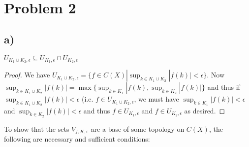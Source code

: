 \section*{Problem 2}
\subsection*{a)}
\begin{lemma}
$U_{K_1 \cup K_2,\epsilon} \subseteq U_{K_1,\epsilon}\cap U_{K_2,\epsilon}$
\begin{proof}
We have $U_{K_1 \cup K_2,\epsilon}=\{ f\in C(X) | \sup_{k\in K_1\cup K_2} |f(k)| < \epsilon \}$. Now $\sup_{k\in K_1\cup K_2} |f(k)| = \max\{\sup_{k\in K_1}|f(k),\sup_{k\in K_2}|f(k)|\}$ and thus if $\sup_{k\in K_1\cup K_2} |f(k)|<\epsilon$ (i.e. $f\in U_{K_1 \cup K_2,\epsilon}$, we must have $\sup_{k\in K_1} |f(k)|<\epsilon$ and $\sup_{k\in K_2} |f(k)|<\epsilon$ and thus $f\in U_{K_1,\epsilon}$ and $f\in U_{K_2,\epsilon}$ as desired. 
\end{proof}
\end{lemma}
To show that the sets $V_{f,K,\epsilon}$ are a base of some topology on $C(X)$, the following are necessary and sufficient conditions:
